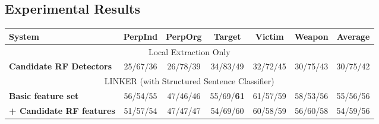 \subsection{Experimental Results}

\begin{table}[t]
\footnotesize
\centering
\begin{tabular}[center]{|l|ccccc|c|} \hline
{\bf System} & {\bf PerpInd} & {\bf PerpOrg} & {\bf Target} & {\bf Victim} &
{\bf Weapon}  & {\bf Average} \\ \hline
\multicolumn{7}{|c|}{Local Extraction Only} \\ \hline
{\bf Candidate RF Detectors} & 25/67/36 & 26/78/39 & 34/83/49 & 32/72/45 & 30/75/43  & 30/75/42 \\ \hline
\multicolumn{7}{|c|}{LINKER (with Structured Sentence Classifier)} \\ \hline
{\bf Basic feature set} & 56/54/55 & 47/46/46 & 55/69/{\bf 61} & 61/57/59 & 58/53/56  & 55/56/56 \\ \hline
{\bf + Candidate RF features} & 51/57/54 & 47/47/47 & 54/69/60 & 60/58/59 & 56/60/58 & 54/59/56 \\ \hline

\end{tabular}
\end{table}
